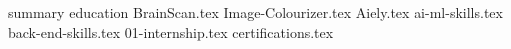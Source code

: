 \documentclass{cv_template}
\begin{document}
{summary}
{education}
{BrainScan.tex}
{Image-Colourizer.tex}
{Aiely.tex}
{ai-ml-skills.tex}
{back-end-skills.tex}
{01-internship.tex}
{certifications.tex}
\end{document}
